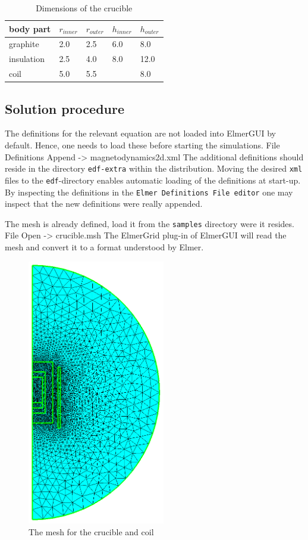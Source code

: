 \begin{table}
\caption{Dimensions of the crucible}
\label{tab:ind_heat_b}
\begin{center}
\begin{tabular}{lllll} \hline
body part &  $r_{inner}$ & $r_{outer}$ & $h_{inner}$ & $h_{outer}$ \\ \hline
graphite  &  2.0   &  2.5 & 6.0 & 8.0 \\
insulation &  2.5   &  4.0 & 8.0 & 12.0 \\
coil      &  5.0   & 5.5  &     & 8.0  \\ \hline
\end{tabular}
\end{center}
\end{table}

\subsection*{Solution procedure}

The definitions for the relevant equation are not loaded into ElmerGUI by default. Hence, 
one needs to load these before starting the simulations.
\ttbegin
File 
  Definitions
    Append -> magnetodynamics2d.xml
\ttend
The additional definitions should reside in the directory \texttt{edf-extra} within the distribution.
Moving the desired \texttt{xml} files to the \texttt{edf}-directory enables automatic loading of the 
definitions at start-up. By inspecting the definitions in the \texttt{Elmer Definitions File editor} one
may inspect that the new definitions were really appended. 

The mesh is already defined, load it from the \texttt{samples} directory were it resides.
\ttbegin
File 
  Open -> crucible.msh
\ttend
The ElmerGrid plug-in of ElmerGUI will read the mesh and convert it to a format understood by Elmer. 

\begin{figure}[h]
\centering
\includegraphics[width=60mm]{crucible_mesh}
\caption{The mesh for the crucible and coil}\label{fg:crucible_mesh}
\end{figure}  



